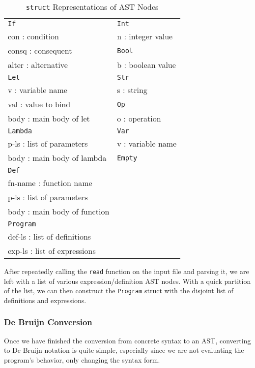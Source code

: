 \documentclass[12pt]{article}
\newcommand{\tab}{\hspace{6mm}}
\newcommand{\key}[1]{\texttt{#1}}
\begin{document}
\begin{table}[H]
  \centering
  \begin{mdframed}
    \begin{tabular}{ll}
      \key{If} & \key{Int} \\
      \tab con : condition & \tab n : integer value \\
      \tab consq : consequent & \key{Bool} \\
      \tab alter : alternative & \tab b : boolean value \\
      \key{Let} & \key{Str} \\
      \tab v : variable name & \tab s : string \\
      \tab val : value to bind & \key{Op} \\
      \tab body : main body of let & \tab o : operation \\
      \key{Lambda} & \key{Var} \\
      \tab p-ls : list of parameters & \tab v : variable name \\
      \tab body : main body of lambda & \key{Empty} \\
      \key{Def} \\
      \tab fn-name : function name \\
      \tab p-ls : list of parameters \\
      \tab body : main body of function \\
      \key{Program} \\
      \tab def-ls : list of definitions \\
      \tab exp-ls : list of expressions
    \end{tabular}
  \end{mdframed}
  \caption{\key{struct} Representations of AST Nodes}
  \label{ast-structs}
\end{table}

After repeatedly calling the \key{read} function on the input file and parsing it, we are left with a list of various expression/definition AST nodes. With a quick partition of the list, we can then construct the \key{Program} struct with the disjoint list of definitions and expressions.

\subsubsection{De Bruijn Conversion}
Once we have finished the conversion from concrete syntax to an AST, converting to De Bruijn notation is quite simple, especially since we are not evaluating the program's behavior, only changing the syntax form.
\end{document}
